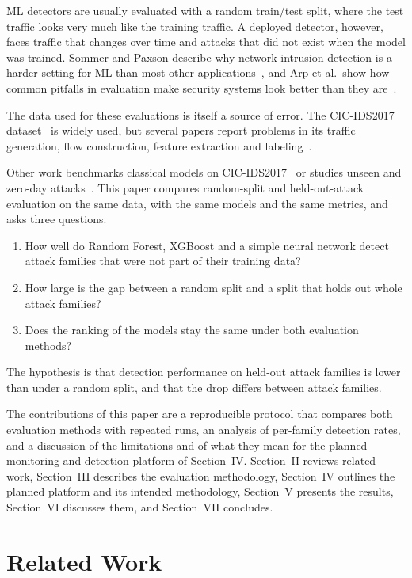 \documentclass[conference]{IEEEtran}
\newif\ifshowtodo
\newcommand{\todo}[1]{\ifshowtodo{\color{red}\textbf{[TODO: #1]}}\fi}
\begin{document}
ML detectors are usually evaluated with a random train/test split, where the test traffic looks very much like the training traffic. A deployed detector, however, faces traffic that changes over time and attacks that did not exist when the model was trained. Sommer and Paxson describe why network intrusion detection is a harder setting for ML than most other applications~\cite{sommer2010}, and Arp et al.\ show how common pitfalls in evaluation make security systems look better than they are~\cite{arp2022}.

The data used for these evaluations is itself a source of error. The CIC-IDS2017 dataset~\cite{sharafaldin2018} is widely used, but several papers report problems in its traffic generation, flow construction, feature extraction and labeling~\cite{engelen2021,lanvin2023,liu2022}.

Other work benchmarks classical models on CIC-IDS2017~\cite{maseer2021,rosay2022} or studies unseen and zero-day attacks~\cite{verkerken2022,hindy2020}. This paper compares random-split and held-out-attack evaluation on the same data, with the same models and the same metrics, and asks three questions. \todo{confirm this gap after reading the abstracts and full texts of these papers}
\begin{enumerate}
\item[RQ1:] How well do Random Forest, XGBoost and a simple neural network detect attack families that were not part of their training data?
\item[RQ2:] How large is the gap between a random split and a split that holds out whole attack families?
\item[RQ3:] Does the ranking of the models stay the same under both evaluation methods?
\end{enumerate}
The hypothesis is that detection performance on held-out attack families is lower than under a random split, and that the drop differs between attack families.

The contributions of this paper are a reproducible protocol that compares both evaluation methods with repeated runs, an analysis of per-family detection rates, and a discussion of the limitations and of what they mean for the planned monitoring and detection platform of Section~IV. Section~II reviews related work, Section~III describes the evaluation methodology, Section~IV outlines the planned platform and its intended methodology, Section~V presents the results, Section~VI discusses them, and Section~VII concludes.

\section{Related Work}
\end{document}
